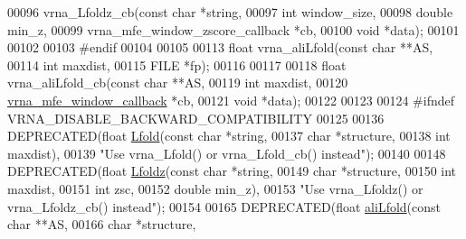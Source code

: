 \begin{DoxyCode}
00096 vrna\_Lfoldz\_cb(\textcolor{keyword}{const} \textcolor{keywordtype}{char}                       *\textcolor{keywordtype}{string},
00097                \textcolor{keywordtype}{int}                              window\_size,
00098                \textcolor{keywordtype}{double}                           min\_z,
00099                vrna\_mfe\_window\_zscore\_callback  *cb,
00100                \textcolor{keywordtype}{void}                             *data);
00101 
00102 
00103 \textcolor{preprocessor}{#endif}
00104 
00105 
00113 \textcolor{keywordtype}{float} vrna\_aliLfold(\textcolor{keyword}{const} \textcolor{keywordtype}{char}  **AS,
00114                     \textcolor{keywordtype}{int}         maxdist,
00115                     FILE        *fp);
00116 
00117 
00118 \textcolor{keywordtype}{float} vrna\_aliLfold\_cb(\textcolor{keyword}{const} \textcolor{keywordtype}{char}               **AS,
00119                        \textcolor{keywordtype}{int}                      maxdist,
00120                        \hyperlink{group__mfe__fold_ga4f3e5bc214ef803074ace313cb9571b4}{vrna\_mfe\_window\_callback} *cb,
00121                        \textcolor{keywordtype}{void}                     *data);
00122 
00123 
00124 \textcolor{preprocessor}{#ifndef VRNA\_DISABLE\_BACKWARD\_COMPATIBILITY}
00125 
00136 DEPRECATED(\textcolor{keywordtype}{float} \hyperlink{group__local__mfe__fold_ga16e5a70e60835bb969eaecbe6482f1be}{Lfold}(\textcolor{keyword}{const} \textcolor{keywordtype}{char} *\textcolor{keywordtype}{string},
00137                        \textcolor{keywordtype}{char}       *structure,
00138                        \textcolor{keywordtype}{int}        maxdist),
00139 \textcolor{stringliteral}{"Use vrna\_Lfold() or vrna\_Lfold\_cb() instead"});
00140 
00148 DEPRECATED(\textcolor{keywordtype}{float} \hyperlink{group__local__mfe__fold_gab6d79eecc180f586679f7b85cce5cbe9}{Lfoldz}(\textcolor{keyword}{const} \textcolor{keywordtype}{char}  *\textcolor{keywordtype}{string},
00149                         \textcolor{keywordtype}{char}        *structure,
00150                         \textcolor{keywordtype}{int}         maxdist,
00151                         \textcolor{keywordtype}{int}         zsc,
00152                         \textcolor{keywordtype}{double}      min\_z),
00153 \textcolor{stringliteral}{"Use vrna\_Lfoldz() or vrna\_Lfoldz\_cb() instead"});
00154 
00165 DEPRECATED(\textcolor{keywordtype}{float} \hyperlink{group__local__consensus__fold_ga864db0f9c428356d978ad0600aa9a8bc}{aliLfold}(\textcolor{keyword}{const} \textcolor{keywordtype}{char} **AS,
00166                \textcolor{keywordtype}{char}       *structure,

\end{DoxyCode}

